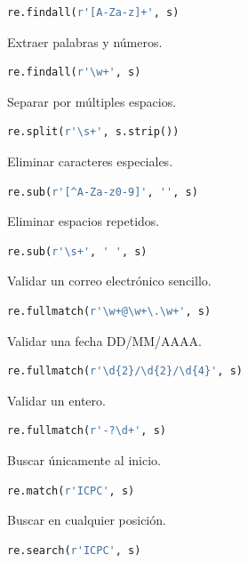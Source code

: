 \begin{lstlisting}[language=Python]
re.findall(r'[A-Za-z]+', s)
\end{lstlisting}

Extraer palabras y números.

\begin{lstlisting}[language=Python]
re.findall(r'\w+', s)
\end{lstlisting}

Separar por múltiples espacios.

\begin{lstlisting}[language=Python]
re.split(r'\s+', s.strip())
\end{lstlisting}

Eliminar caracteres especiales.

\begin{lstlisting}[language=Python]
re.sub(r'[^A-Za-z0-9]', '', s)
\end{lstlisting}

Eliminar espacios repetidos.

\begin{lstlisting}[language=Python]
re.sub(r'\s+', ' ', s)
\end{lstlisting}

Validar un correo electrónico sencillo.

\begin{lstlisting}[language=Python]
re.fullmatch(r'\w+@\w+\.\w+', s)
\end{lstlisting}

Validar una fecha DD/MM/AAAA.

\begin{lstlisting}[language=Python]
re.fullmatch(r'\d{2}/\d{2}/\d{4}', s)
\end{lstlisting}

Validar un entero.

\begin{lstlisting}[language=Python]
re.fullmatch(r'-?\d+', s)
\end{lstlisting}

Buscar únicamente al inicio.

\begin{lstlisting}[language=Python]
re.match(r'ICPC', s)
\end{lstlisting}

Buscar en cualquier posición.

\begin{lstlisting}[language=Python]
re.search(r'ICPC', s)
\end{lstlisting}

